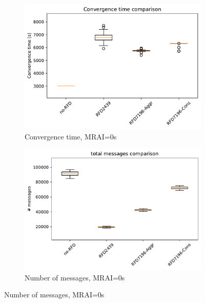 \begin{figure}[H]
     \centering
     \begin{subfigure}[b]{0.325\textwidth}
         \centering
         \includegraphics[width=\textwidth]{images/RFD/miceVSelephants/MultiMRAI/0/mice/cisco_1000MRAI0_rfd_comparison_time_boxplot.pdf}
         \caption{\scriptsize Convergence time, MRAI=0s}
         \label{fig:1000_RFD_MRAI0_time_mice}
     \end{subfigure}
     \hfill
     \begin{subfigure}[b]{0.325\textwidth}
         \centering
         \includegraphics[width=\textwidth]{images/RFD/miceVSelephants/MultiMRAI/0/mice/cisco_1000MRAI0_rfd_comparison_messages_boxplot.pdf}
         \caption{\scriptsize Number of messages, MRAI=0s}
         \label{fig:1000_RFD_MRAI0_messages_mice}
     \end{subfigure}

\end{figure}
